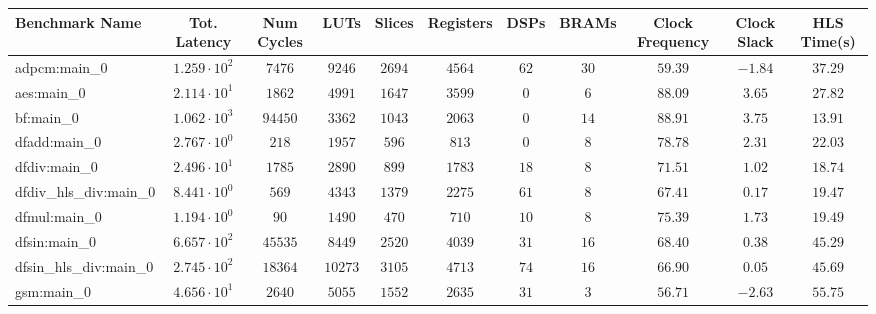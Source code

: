 \begin{tabular}{|l|c|c|c|c|c|c|c|c|c|c|}
\hline
Benchmark Name          & Tot. Latency           & Num Cycles & LUTs      & Slices    & Registers & DSPs    & BRAMs   & Clock Frequency & Clock Slack & HLS Time(s) \\
\hline
adpcm:main\_0           & $ 1.259 \cdot 10^{2} $ & $ 7476   $ & $ 9246  $ & $ 2694  $ & $ 4564  $ & $ 62  $ & $ 30  $ & $ 59.39       $ & $ -1.84   $ & $ 37.29   $ \\
aes:main\_0             & $ 2.114 \cdot 10^{1} $ & $ 1862   $ & $ 4991  $ & $ 1647  $ & $ 3599  $ & $ 0   $ & $ 6   $ & $ 88.09       $ & $ 3.65    $ & $ 27.82   $ \\
bf:main\_0              & $ 1.062 \cdot 10^{3} $ & $ 94450  $ & $ 3362  $ & $ 1043  $ & $ 2063  $ & $ 0   $ & $ 14  $ & $ 88.91       $ & $ 3.75    $ & $ 13.91   $ \\
dfadd:main\_0           & $ 2.767 \cdot 10^{0} $ & $ 218    $ & $ 1957  $ & $ 596   $ & $ 813   $ & $ 0   $ & $ 8   $ & $ 78.78       $ & $ 2.31    $ & $ 22.03   $ \\
dfdiv:main\_0           & $ 2.496 \cdot 10^{1} $ & $ 1785   $ & $ 2890  $ & $ 899   $ & $ 1783  $ & $ 18  $ & $ 8   $ & $ 71.51       $ & $ 1.02    $ & $ 18.74   $ \\
dfdiv\_hls\_div:main\_0 & $ 8.441 \cdot 10^{0} $ & $ 569    $ & $ 4343  $ & $ 1379  $ & $ 2275  $ & $ 61  $ & $ 8   $ & $ 67.41       $ & $ 0.17    $ & $ 19.47   $ \\
dfmul:main\_0           & $ 1.194 \cdot 10^{0} $ & $ 90     $ & $ 1490  $ & $ 470   $ & $ 710   $ & $ 10  $ & $ 8   $ & $ 75.39       $ & $ 1.73    $ & $ 19.49   $ \\
dfsin:main\_0           & $ 6.657 \cdot 10^{2} $ & $ 45535  $ & $ 8449  $ & $ 2520  $ & $ 4039  $ & $ 31  $ & $ 16  $ & $ 68.40       $ & $ 0.38    $ & $ 45.29   $ \\
dfsin\_hls\_div:main\_0 & $ 2.745 \cdot 10^{2} $ & $ 18364  $ & $ 10273 $ & $ 3105  $ & $ 4713  $ & $ 74  $ & $ 16  $ & $ 66.90       $ & $ 0.05    $ & $ 45.69   $ \\
gsm:main\_0             & $ 4.656 \cdot 10^{1} $ & $ 2640   $ & $ 5055  $ & $ 1552  $ & $ 2635  $ & $ 31  $ & $ 3   $ & $ 56.71       $ & $ -2.63   $ & $ 55.75   $ \\

\end{tabular}
